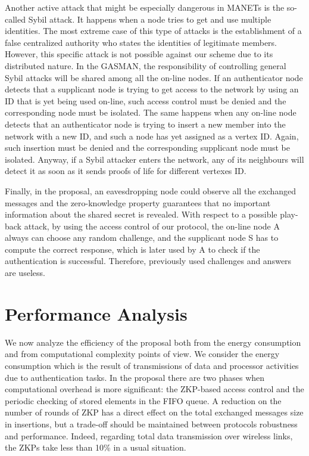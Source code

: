 \documentclass{article}
\begin{document}
Another active attack that might be especially dangerous in MANETs
is the so-called Sybil attack. It happens when a node tries to get
and use multiple identities. The most extreme case of this type of
attacks is the establishment of a false centralized authority who
states the identities of legitimate members. However, this
specific attack is not possible against our scheme due to its
distributed nature. In the GASMAN, the responsibility of
controlling general Sybil attacks will be shared among all the
on-line nodes. If an authenticator  node detects that a supplicant
node is trying to get access to the network by using an
 ID that is yet being used on-line, such access control must be denied and the corresponding node must be isolated. The same happens when any on-line node detects that
an authenticator node is trying to insert a new member into the
network with a new ID, and such a node has yet assigned as a vertex
ID. Again, such insertion must be denied and the corresponding
supplicant node must be isolated. Anyway, if a Sybil attacker
enters the network, any of its neighbours will detect it as soon
as it sends proofs of life for different vertexes ID.

Finally, in the proposal, an eavesdropping node could observe all the exchanged messages and the zero-knowledge property guarantees that no important information about the shared secret is revealed.  With respect to a possible play-back attack, by using the access control of our protocol, the on-line node A always can choose any random challenge, and the supplicant node S has to compute the correct response, which is later used by A to check if the authentication is successful. Therefore, previously used challenges and answers are useless.

\section{Performance Analysis}
\label{PerformanceAnalysis}
We now analyze the efficiency of the proposal both from the energy
consumption and from computational complexity points of view. We
consider the energy consumption which is the result of
transmissions of data and processor activities due to
authentication tasks. In the proposal there are two phases when
computational overhead is more significant: the ZKP-based access
control and the periodic checking of stored elements in the FIFO queue. A
reduction on the number of rounds of ZKP has a direct effect on
the total exchanged messages size in insertions, but a trade-off
should be maintained between protocols robustness and performance.
Indeed, regarding total data transmission over wireless links, the
ZKPs take less than 10\% in a usual situation.
\end{document}
